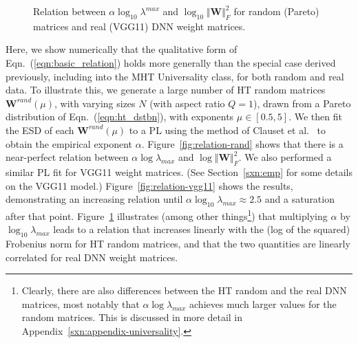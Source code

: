 {\begin{figure}[!htb]
{        \label{fig:relation-vgg11}
    }
        \caption{Relation between $\alpha\log_{10}\lambda^{max}$ and $\log_{10}\Vert\mathbf{W}\Vert^{2}_{F}$ for random (Pareto) matrices and real (VGG11) DNN weight matrices.
                 }
    \label{fig:relations}
\end{figure}

Here, we show numerically that the qualitative form of Eqn.~(\ref{eqn:basic_relation}) holds more generally than the special case derived previously, including into the MHT Universality class, for both random and real data.
To illustrate this, we generate a large number of HT random matrices $\mathbf{W}^{rand}(\mu)$, with varying sizes $N$ (with aspect ratio $Q=1$), drawn from a Pareto distribution of Eqn.~(\ref{eqn:ht_dstbn}), with exponents $\mu\in[0.5, 5]$.
We then fit the ESD of each $\mathbf{W}^{rand}(\mu)$ to a PL using the method of Clauset et al.~\cite{CSN09_powerlaw,ABP14} to obtain the empirical exponent $\alpha$.   
Figure~\ref{fig:relation-rand} shows that there is a near-perfect relation between $ \alpha\log\lambda_{max}$ and $\log\Vert\mathbf{W}\Vert^{2}_{F} $.
We also performed a similar PL fit for VGG11 weight matrices.
(See Section~\ref{sxn:emp} for some details on the VGG11 model.)
Figure~\ref{fig:relation-vgg11} shows the results, demonstrating an increasing relation until $ \alpha\log_{10}\lambda_{max} \approx 2.5$ and a saturation after that point.
Figure~\ref{fig:relations} illustrates
(among other things\footnote{Clearly, there are also differences between the HT random and the real DNN matrices, most notably that $ \alpha\log\lambda_{max} $ achieves much larger values for the random matrices.  This is discussed in more detail in Appendix~\ref{sxn:appendix-universality}.})
that multiplying $\alpha$ by $\log_{10}\lambda_{max}$ leads to a relation that increases linearly with the (log of the squared) Frobenius norm for HT random matrices, and that the two quantities are linearly correlated for real DNN weight matrices.




}
